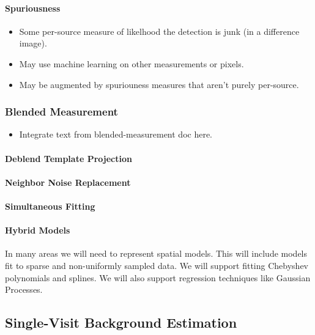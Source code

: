 \paragraph{Spuriousness}
\label{sec:acSpuriousnessAlgorithms}
\begin{itemize}
\item Some per-source measure of likelhood the detection is junk (in a difference image).
\item May use machine learning on other measurements or pixels.
\item May be augmented by spuriouness measures that aren't purely per-source.
\end{itemize}

\subsubsection{Blended Measurement}
\label{sec:acBlendedMeasurement}
\begin{itemize}
\item Integrate text from blended-measurement doc here.
\end{itemize}

\paragraph{Deblend Template Projection}
\label{sec:acDeblendTemplateProjection}
\paragraph{Neighbor Noise Replacement}
\label{sec:acReplaceNeighborsWithNoise}
\paragraph{Simultaneous Fitting}
\label{sec:acSimultaneousFitting}
\paragraph{Hybrid Models}
\label{sec:acHybridModels}

\label{Spatial Models}
\label{sec:acSpatialModels}
In many areas we will need to represent spatial models.  This will include models fit to sparse and non-uniformly sampled data.  We will support fitting Chebyshev polynomials and splines.  We will also support regression techniques like Gaussian Processes.

\subsection{Single-Visit Background Estimation}
\label{sec:acSingleVisitBackgroundEstimation}

